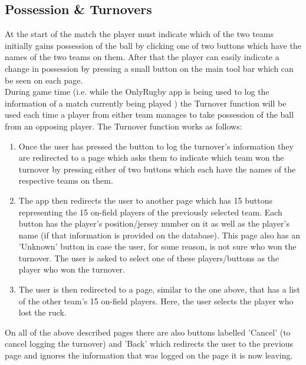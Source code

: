 \documentclass[hidelinks,a4paper,12pt]{article}
\begin{document}
	\subsection{Possession \& Turnovers}
		At the start of the match the player must indicate which of the two teams initially gains possession of the ball by clicking one of two buttons which have the names of the two teams on them. After that the player can easily indicate a change in possession by pressing a small button on the main tool bar which can be seen on each page.
		\\
		During game time (i.e. while the OnlyRugby app is being used to log the information of a match currently being played ) the Turnover function will be used each time a player from either team manages to take possession of the ball from an opposing player. The Turnover function works as follows:
		\begin{enumerate}
			\item Once the user has pressed the button to log the turnover's information they are redirected to a page which asks them to indicate which team won the turnover by pressing either of two buttons which each
			have the names of the respective teams on them.
			\item The app then redirects the user to another page which has 15 buttons representing the 15 on-field players of the previously selected team. Each button has the player's position/jersey number on it 
			as well as the player's name (if that information is provided on the database). This page also has an 'Unknown' button in case the user, for some reason, is not sure who won the turnover. The user is asked to select one of these players/buttons as the player who won the turnover.
			\item The user is then redirected to a page, similar to the one above, that has a list of the other team's 15 on-field players. Here, the user selects the player who lost the ruck.
		\end{enumerate}
	On all of the above described pages there are also buttons labelled 'Cancel' (to cancel logging the turnover) and 'Back' which redirects the user to the previous page and ignores the information that was logged on the page it is now leaving.
\end{document}
